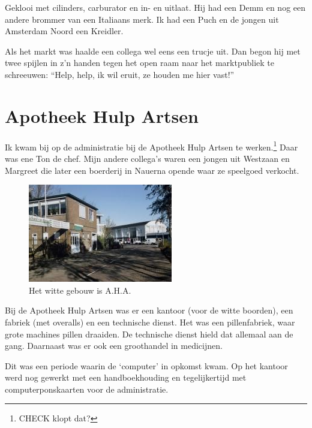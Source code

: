 \documentclass[10pt,twoside, openright]{memoir}
\begin{document}
Geklooi met cilinders, carburator en in- en uitlaat. Hij had een Demm en nog een andere brommer van een Italiaans merk. Ik had een Puch en de jongen uit Amsterdam Noord een Kreidler. 

Als het markt was haalde een collega wel eens een trucje uit.  Dan begon hij met twee spijlen in z'n handen tegen het open raam naar het marktpubliek te schreeuwen: ``Help, help, ik wil eruit, ze houden me hier vast!''

\chapter{Apotheek Hulp Artsen} %
\label{cha:apotheek}

Ik kwam bij op de administratie bij de Apotheek Hulp Artsen te werken.\footnote{CHECK klopt dat?} Daar was ene Ton de chef. Mijn andere collega's waren een jongen uit Westzaan en Margreet die later een boerderij in Nauerna opende waar ze speelgoed verkocht. 

\begin{figure}
\includegraphics[width=\textwidth]{img/ch33/image}
\caption*{\footnotesize Het witte gebouw is A.H.A.}
\end{figure}

Bij de Apotheek Hulp Artsen was er een kantoor (voor de witte boorden), een fabriek (met overalls) en een technische dienst. Het was een pillenfabriek, waar grote machines pillen draaiden. De technische dienst hield dat allemaal aan de gang. Daarnaast was er ook een groothandel in medicijnen. 

Dit was een periode waarin de `computer' in opkomst kwam. Op het kantoor werd nog gewerkt met een handboekhouding en tegelijkertijd met computerponskaarten voor de administratie. 
\end{document}

